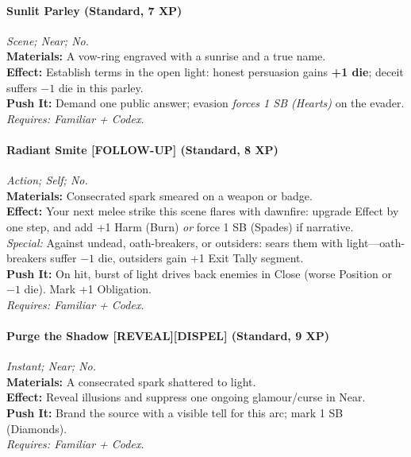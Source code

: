 \paragraph{Sunlit Parley (Standard, 7 XP)} \emph{Scene; Near; No.}\\
\textbf{Materials:} A vow-ring engraved with a sunrise and a true name.\\
\textbf{Effect:} Establish terms in the open light: honest persuasion gains \textbf{+1 die}; deceit suffers \(-1\) die in this parley.\\
\textbf{Push It:} Demand one public answer; evasion \emph{forces 1 SB (Hearts)} on the evader.\\
\emph{Requires: Familiar + Codex.}

\paragraph{Radiant Smite \textnormal{[FOLLOW-UP]} (Standard, 8 XP)} \emph{Action; Self; No.}\\
\textbf{Materials:} Consecrated spark smeared on a weapon or badge.\\
\textbf{Effect:} Your next melee strike this scene flares with dawnfire: upgrade Effect by one step, and add +1 Harm (Burn) \emph{or} force 1 SB (Spades) if narrative.\\
\textit{Special:} Against undead, oath-breakers, or outsiders: sears them with light—oath-breakers suffer \(-1\) die, outsiders gain +1 Exit Tally segment.\\
\textbf{Push It:} On hit, burst of light drives back enemies in Close (worse Position or \(-1\) die). Mark +1 Obligation.\\
\emph{Requires: Familiar + Codex.}

\paragraph{Purge the Shadow \textnormal{[REVEAL][DISPEL]} (Standard, 9 XP)} \emph{Instant; Near; No.}\\
\textbf{Materials:} A consecrated spark shattered to light.\\
\textbf{Effect:} Reveal illusions and suppress one ongoing glamour/curse in Near.\\
\textbf{Push It:} Brand the source with a visible tell for this arc; mark 1 SB (Diamonds).\\
\emph{Requires: Familiar + Codex.}

